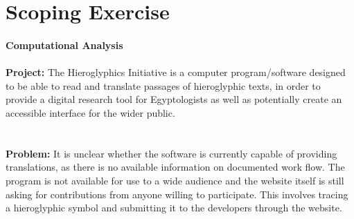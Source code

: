 \documentclass{article}
\author{Bree Kelly} \date{}
\begin{document}
\maketitle

\section*{Scoping Exercise}

\paragraph{} \noindent \large \break
\textbf{Computational Analysis}
\paragraph{} \noindent \break
\textbf{Project:}
\newline \noindent \break
The Hieroglyphics Initiative is a computer program/software designed to be able to read and translate passages of hieroglyphic texts, in order to provide a digital research tool for Egyptologists as well as potentially create an accessible interface for the wider public.
\paragraph{} ~\\\noindent
\textbf{Problem:}
\newline \break \noindent
It is unclear whether the software is currently capable of providing translations, as there is no available information on documented work flow. The program is not available for use to a wide audience and the website itself is still asking for contributions from anyone willing to participate. This involves tracing a hieroglyphic symbol and submitting it to the developers through the website.
\end{document}
